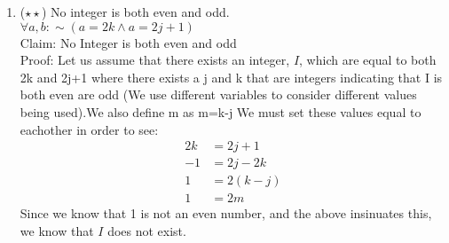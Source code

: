 \documentclass{letter}
\theoremstyle{definition}
\begin{document}
\begin{description}
\begin{enumerate}
		\item ($\star \star$) No integer is both even and odd. \\
$\forall a, b: \sim (a=2k \wedge a=2j+1)$ \\
Claim: No Integer is both even and odd \\
Proof: Let us assume that there exists an integer, $I$, which are equal to both 2k and 2j+1 where there exists a j and k that are integers indicating that I is both even are odd (We use different variables to consider different values being used).We also define m as m=k-j We must set these values equal to eachother in order to see:\\
\begin{align*}
2k &= 2j+1 \\
-1 &= 2j-2k \tag{subtracts 2k and -1 from both sides}\\
1 &= 2(k-j)\tag{multiplies -1 by both sides and factors out 2 from 2j-2k}\\
1 &= 2m \tag{Represents k-j as m}
\end{align*}
Since we know that 1 is not an even number, and the above insinuates this, we know that $I$ does not exist. \\


\end{enumerate}
\end{description}
\end{document}
